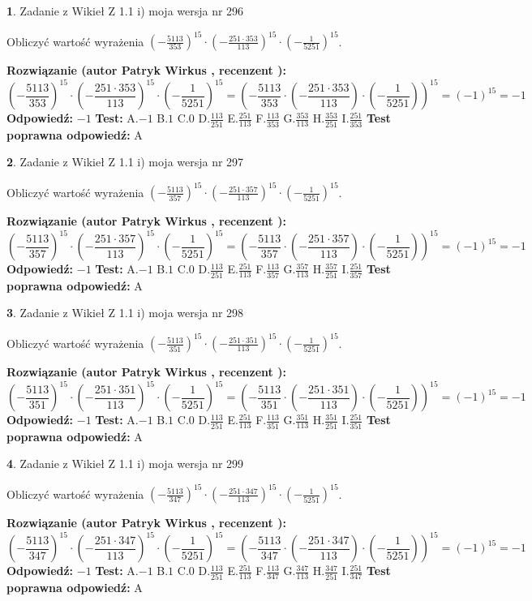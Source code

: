 \documentclass[12pt, a4paper]{article}
\theoremstyle{definition} %
\newtheorem{zad}{}
\newcommand{\zadStart}[1]{\begin{zad}#1\newline}
\newcommand{\zadStop}{\end{zad}}
\newcommand{\rozwStart}[2]{\noindent \textbf{Rozwiązanie (autor #1 , recenzent #2): }\newline}
\newcommand{\rozwStop}{\newline}
\newcommand{\odpStart}{\noindent \textbf{Odpowiedź:}\newline}
\newcommand{\odpStop}{\newline}
\newcommand{\testStart}{\noindent \textbf{Test:}\newline}
\newcommand{\testStop}{\newline}
\newcommand{\kluczStart}{\noindent \textbf{Test poprawna odpowiedź:}\newline}
\newcommand{\kluczStop}{\newline}
\begin{document}
\zadStart{Zadanie z Wikieł Z 1.1 i) moja wersja nr 296}

Obliczyć wartość wyrażenia $(-\frac{5113}{353})^{15} \cdot (-\frac{251 \cdot 353}{113})^{15} \cdot (-\frac{1}{5251})^{15}$.
\zadStop
\rozwStart{Patryk Wirkus}{}
$$(-\frac{5113}{353})^{15} \cdot (-\frac{251 \cdot 353}{113})^{15} \cdot (-\frac{1}{5251})^{15} = (-\frac{5113}{353} \cdot (-\frac{251 \cdot 353}{113}) \cdot (-\frac{1}{5251}))^{15} = (-1)^{15} = -1$$
\rozwStop
\odpStart
$-1$
\odpStop
\testStart
A.$-1$ B.$1$ C.$0$ D.$\frac{113}{251}$ E.$\frac{251}{113}$
F.$\frac{113}{353}$ G.$\frac{353}{113}$
H.$\frac{353}{251}$
I.$\frac{251}{353}$
\testStop
\kluczStart
A
\kluczStop



\zadStart{Zadanie z Wikieł Z 1.1 i) moja wersja nr 297}

Obliczyć wartość wyrażenia $(-\frac{5113}{357})^{15} \cdot (-\frac{251 \cdot 357}{113})^{15} \cdot (-\frac{1}{5251})^{15}$.
\zadStop
\rozwStart{Patryk Wirkus}{}
$$(-\frac{5113}{357})^{15} \cdot (-\frac{251 \cdot 357}{113})^{15} \cdot (-\frac{1}{5251})^{15} = (-\frac{5113}{357} \cdot (-\frac{251 \cdot 357}{113}) \cdot (-\frac{1}{5251}))^{15} = (-1)^{15} = -1$$
\rozwStop
\odpStart
$-1$
\odpStop
\testStart
A.$-1$ B.$1$ C.$0$ D.$\frac{113}{251}$ E.$\frac{251}{113}$
F.$\frac{113}{357}$ G.$\frac{357}{113}$
H.$\frac{357}{251}$
I.$\frac{251}{357}$
\testStop
\kluczStart
A
\kluczStop



\zadStart{Zadanie z Wikieł Z 1.1 i) moja wersja nr 298}

Obliczyć wartość wyrażenia $(-\frac{5113}{351})^{15} \cdot (-\frac{251 \cdot 351}{113})^{15} \cdot (-\frac{1}{5251})^{15}$.
\zadStop
\rozwStart{Patryk Wirkus}{}
$$(-\frac{5113}{351})^{15} \cdot (-\frac{251 \cdot 351}{113})^{15} \cdot (-\frac{1}{5251})^{15} = (-\frac{5113}{351} \cdot (-\frac{251 \cdot 351}{113}) \cdot (-\frac{1}{5251}))^{15} = (-1)^{15} = -1$$
\rozwStop
\odpStart
$-1$
\odpStop
\testStart
A.$-1$ B.$1$ C.$0$ D.$\frac{113}{251}$ E.$\frac{251}{113}$
F.$\frac{113}{351}$ G.$\frac{351}{113}$
H.$\frac{351}{251}$
I.$\frac{251}{351}$
\testStop
\kluczStart
A
\kluczStop



\zadStart{Zadanie z Wikieł Z 1.1 i) moja wersja nr 299}

Obliczyć wartość wyrażenia $(-\frac{5113}{347})^{15} \cdot (-\frac{251 \cdot 347}{113})^{15} \cdot (-\frac{1}{5251})^{15}$.
\zadStop
\rozwStart{Patryk Wirkus}{}
$$(-\frac{5113}{347})^{15} \cdot (-\frac{251 \cdot 347}{113})^{15} \cdot (-\frac{1}{5251})^{15} = (-\frac{5113}{347} \cdot (-\frac{251 \cdot 347}{113}) \cdot (-\frac{1}{5251}))^{15} = (-1)^{15} = -1$$
\rozwStop
\odpStart
$-1$
\odpStop
\testStart
A.$-1$ B.$1$ C.$0$ D.$\frac{113}{251}$ E.$\frac{251}{113}$
F.$\frac{113}{347}$ G.$\frac{347}{113}$
H.$\frac{347}{251}$
I.$\frac{251}{347}$
\testStop
\kluczStart
A
\kluczStop
\end{document}
